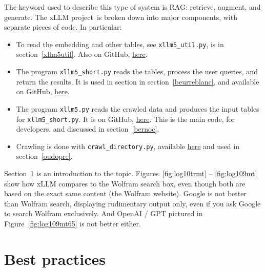 \documentclass[oneside,10pt]{book}
\begin{document}
\noindent The keyword used to describe this type of system is \textcolor{index}{RAG}: retrieve, augment, and generate. The xLLM project~is broken down into major components, with separate pieces of code. In particular:
\vspace{1ex}


\begin{itemize}
\item To read the embedding and other tables, see \texttt{xllm5\_util.py}, is in section~\ref{xllm5util}.
Also on GitHub, \href{https://github.com/VincentGranville/Large-Language-Models/blob/main/xllm5/xllm5_util.py}{here}.

\item The program \texttt{xllm5\_short.py}  reads the tables, process the user queries, and return the results.  It is used in section
 in section~\ref{beurreblanc}, and available on GitHub, \href{https://github.com/VincentGranville/Large-Language-Models/blob/main/xllm5/xllm5_short.py}{here}. 

\item The program \texttt{xllm5.py} reads the crawled data and produces the input tables for 
\texttt{xllm5\_short.py}. It is on GitHub, \href{https://github.com/VincentGranville/Large-Language-Models/blob/main/xllm5/xllm5.py}{here}.  This is the main code, for developers, and discussed in section~\ref{bernoc}.

\item Crawling is done with 
\texttt{crawl\_directory.py}, available \href{https://github.com/VincentGranville/Large-Language-Models/blob/main/crawl_directory.py}{here} and used in 
section~\ref{oudopre}. 
\end{itemize}
\vspace{1ex}

\noindent Section~\ref{mnbrd} is an introduction to the topic. Figures~\ref{fig:log10trmt} -- \ref{fig:log109mt} show how xLLM compares to the Wolfram search box, even though both are based on the exact same content (the Wolfram website). Google is not better than Wolfram search, displaying rudimentary output only, even
 if you ask Google to search Wolfram exclusively. And OpenAI / GPT pictured in Figure~\ref{fig:log109mt65} is not better either. 



\section{Best practices}\label{mnbrd}
\end{document}
